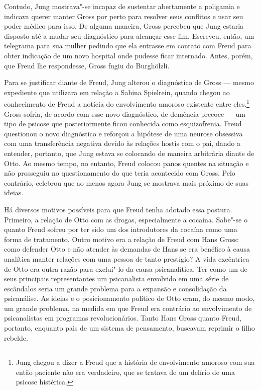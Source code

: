 Contudo, Jung mostrava"-se incapaz de sustentar abertamente a poligamia e
indicava querer manter Gross por perto para resolver seus conflitos e
usar seu poder médico para isso. De alguma maneira, Gross percebeu que
Jung estaria disposto até a mudar seu diagnóstico para alcançar esse
fim. Escreveu, então, um telegrama para sua mulher pedindo que ela
entrasse em contato com Freud para obter indicação de um novo hospital
onde pudesse ficar internado. Antes, porém, que Freud lhe respondesse,
Gross fugiu do Burghölzli.

Para se justificar diante de Freud, Jung alterou o diagnóstico de Gross
--- mesmo expediente que utilizara em relação a Sabina Spielrein, quando
chegou ao conhecimento de Freud a notícia do envolvimento amoroso
existente entre eles.\footnote{Jung chegou a dizer a Freud que a história
  de envolvimento amoroso com sua então paciente não era verdadeiro, que
  se tratava de um delírio de uma psicose histérica.} Gross sofria, de
acordo com esse novo diagnóstico, de demência precoce --- um tipo de
psicose que posteriormente ficou conhecida como esquizofrenia. Freud
questionou o novo diagnóstico e reforçou a hipótese de uma neurose
obsessiva com uma transferência negativa devido às relações hostis com o
pai, dando a entender, portanto, que Jung estava se colocando de maneira
arbitrária diante de Otto. Ao mesmo tempo, no entanto, Freud colocou
panos quentes na situação e não prosseguiu no questionamento do que
teria acontecido com Gross. Pelo contrário, celebrou que ao menos agora
Jung se mostrava mais próximo de suas ideias.

Há diversos motivos possíveis para que Freud tenha adotado essa postura.
Primeiro, a relação de Otto com as drogas, especialmente a cocaína.
Sabe"-se o quanto Freud sofreu por ter sido um dos introdutores da
cocaína como uma forma de tratamento. Outro motivo era a relação de
Freud com Hans Gross: como defender Otto e não atender às demandas de
Hans se era benéfico à causa analítica manter relações com uma pessoa de
tanto prestígio? A vida excêntrica de Otto era outra razão para
excluí"-lo da causa psicanalítica. Ter como um de seus principais
representantes um psicanalista envolvido em uma série de escândalos
seria um grande problema para a expansão e consolidação da psicanálise. As
ideias e o posicionamento político de Otto eram, do mesmo modo, um grande
problema, na medida em que Freud era contrário ao envolvimento de
psicanalistas em programas revolucionários. Tanto Hans Gross quanto
Freud, portanto, enquanto pais de um sistema de pensamento, buscavam
reprimir o filho rebelde.


